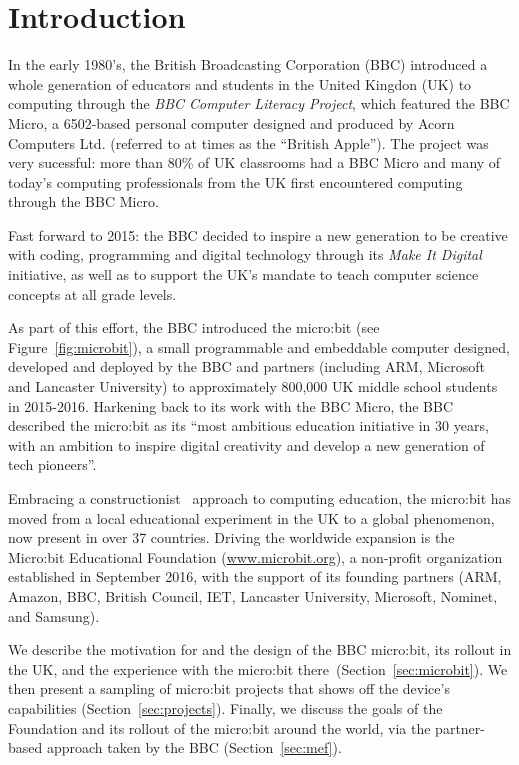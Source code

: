 \section{Introduction}
\label{sec:intrp}

In the early 1980's, the British Broadcasting Corporation (BBC)
introduced a whole generation of educators and students in the United Kingdon (UK)
to computing through the {\em BBC Computer Literacy Project}, which featured the BBC Micro,
a 6502-based personal computer designed and produced by Acorn Computers Ltd. (referred
to at times as the ``British Apple'').  The project was very sucessful:
more than 80\% of UK classrooms had a BBC Micro and many of today's
computing professionals from the UK first encountered computing through
the BBC Micro.~\cite{BBCMicro1982}

Fast forward to 2015: the BBC decided to inspire a new
generation to be creative with coding, programming and digital technology
through its {\em Make It Digital} initiative, as well as to support the UK's mandate to
teach computer science concepts at all grade levels.~\cite{PeytonJones2013ICFP}

As part of this effort, the BBC introduced the micro:bit (see
Figure~\ref{fig:microbit}),
a small programmable and embeddable computer designed,
developed and deployed by the BBC and partners (including ARM, Microsoft
and Lancaster University) to approximately 800,000 UK middle school students
in 2015-2016. Harkening back to its work with the BBC Micro,
the BBC described the micro:bit as its ``most ambitious education initiative in 30 years,
with an ambition to inspire digital creativity and
develop a new generation of tech pioneers''.~\cite{BBCwebsite}

Embracing a constructionist~\cite{Papert} approach to computing education, the micro:bit has moved from
a local educational experiment in the UK to a global phenomenon, now present in over 37 countries.
Driving the worldwide expansion is
the Micro:bit Educational Foundation (\url{www.microbit.org}),
a non-profit organization
established in September 2016, with the support of its founding partners (ARM,
Amazon, BBC, British Council, IET, Lancaster University, Microsoft,
Nominet, and Samsung).

We describe the motivation for and the design of the BBC micro:bit, its
rollout in the UK, and the experience with the micro:bit there~(Section~\ref{sec:microbit}).
We then present a sampling of micro:bit projects that
shows off the device's capabilities (Section~\ref{sec:projects}). Finally, 
we discuss the goals of the Foundation and its rollout of the micro:bit around the world, 
via the partner-based approach taken by the BBC (Section~\ref{sec:mef}).

